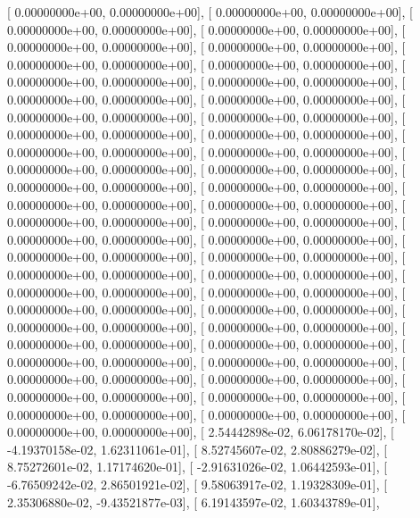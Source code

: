 \documentclass{article}
\begin{document}
       [  0.00000000e+00,   0.00000000e+00],
       [  0.00000000e+00,   0.00000000e+00],
       [  0.00000000e+00,   0.00000000e+00],
       [  0.00000000e+00,   0.00000000e+00],
       [  0.00000000e+00,   0.00000000e+00],
       [  0.00000000e+00,   0.00000000e+00],
       [  0.00000000e+00,   0.00000000e+00],
       [  0.00000000e+00,   0.00000000e+00],
       [  0.00000000e+00,   0.00000000e+00],
       [  0.00000000e+00,   0.00000000e+00],
       [  0.00000000e+00,   0.00000000e+00],
       [  0.00000000e+00,   0.00000000e+00],
       [  0.00000000e+00,   0.00000000e+00],
       [  0.00000000e+00,   0.00000000e+00],
       [  0.00000000e+00,   0.00000000e+00],
       [  0.00000000e+00,   0.00000000e+00],
       [  0.00000000e+00,   0.00000000e+00],
       [  0.00000000e+00,   0.00000000e+00],
       [  0.00000000e+00,   0.00000000e+00],
       [  0.00000000e+00,   0.00000000e+00],
       [  0.00000000e+00,   0.00000000e+00],
       [  0.00000000e+00,   0.00000000e+00],
       [  0.00000000e+00,   0.00000000e+00],
       [  0.00000000e+00,   0.00000000e+00],
       [  0.00000000e+00,   0.00000000e+00],
       [  0.00000000e+00,   0.00000000e+00],
       [  0.00000000e+00,   0.00000000e+00],
       [  0.00000000e+00,   0.00000000e+00],
       [  0.00000000e+00,   0.00000000e+00],
       [  0.00000000e+00,   0.00000000e+00],
       [  0.00000000e+00,   0.00000000e+00],
       [  0.00000000e+00,   0.00000000e+00],
       [  0.00000000e+00,   0.00000000e+00],
       [  0.00000000e+00,   0.00000000e+00],
       [  0.00000000e+00,   0.00000000e+00],
       [  0.00000000e+00,   0.00000000e+00],
       [  0.00000000e+00,   0.00000000e+00],
       [  0.00000000e+00,   0.00000000e+00],
       [  0.00000000e+00,   0.00000000e+00],
       [  0.00000000e+00,   0.00000000e+00],
       [  0.00000000e+00,   0.00000000e+00],
       [  0.00000000e+00,   0.00000000e+00],
       [  0.00000000e+00,   0.00000000e+00],
       [  0.00000000e+00,   0.00000000e+00],
       [  0.00000000e+00,   0.00000000e+00],
       [  0.00000000e+00,   0.00000000e+00],
       [  0.00000000e+00,   0.00000000e+00],
       [  0.00000000e+00,   0.00000000e+00],
       [  0.00000000e+00,   0.00000000e+00],
       [  2.54442898e-02,   6.06178170e-02],
       [ -4.19370158e-02,   1.62311061e-01],
       [  8.52745607e-02,   2.80886279e-02],
       [  8.75272601e-02,   1.17174620e-01],
       [ -2.91631026e-02,   1.06442593e-01],
       [ -6.76509242e-02,   2.86501921e-02],
       [  9.58063917e-02,   1.19328309e-01],
       [  2.35306880e-02,  -9.43521877e-03],
       [  6.19143597e-02,   1.60343789e-01],
\end{document}

